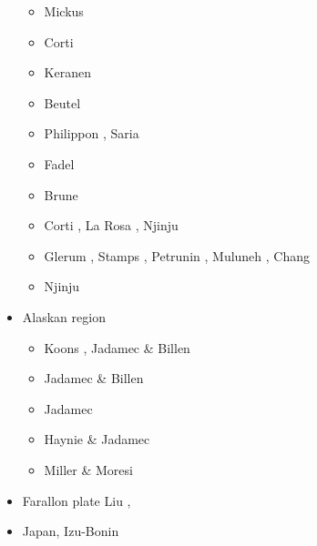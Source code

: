 \begin{itemize}
\begin{scriptsize}
\begin{itemize}
\item[\twothousandseven] Mickus \etal \cite{mitk07}
\item[\twothousandeight] Corti \cite{cort08}
\item[\twothousandnine] Keranen \etal \cite{kekj09}
\item[\twothousandten] Beutel \etal \cite{beve10}
\item[\twothousandfourteen] Philippon \etal \cite{phcs14}, Saria \etal \cite{sacs14}
\item[\twothousandfifteen] Fadel \etal \cite{favk15}
\item[\twothousandseventeen] Brune \etal \cite{brcr17} 
\item[\twothousandnineteen] Corti \etal \cite{cocf19}, La Rosa \etal \cite{lapk19}, Njinju \etal \cite{njas19}
\item[\twothousandtwenty] Glerum \etal \cite{glbs20}, Stamps \etal \cite{stkf20}, 
                          Petrunin \etal \cite{peke20}, Muluneh \etal \cite{mubi20},
                          Chang \etal \cite{chkd20}
\item[\twothousandtwentyone] Njinju \etal \cite{njsn21} 
\end{itemize}
\end{scriptsize}

\item{Alaskan region} 

\begin{scriptsize}
\begin{itemize}
\item[\twothousandten] Koons \etal \cite{kohp10}, Jadamec \& Billen \cite{jabi10a}
\item[\twothousandtwelve] Jadamec \& Billen \cite{jabi12}
\item[\twothousandthirteen] Jadamec \etal \cite{jabr13}
\item[\twothousandseventeen] Haynie \& Jadamec \cite{haja17}
\item[\twothousandeighteen] Miller \& Moresi \cite{mimo18}
\end{itemize}
\end{scriptsize}

\item{Farallon plate} 
{\scriptsize
Liu \etal \cite{lisg08},
\cite{list11}
\cite{list12}
\cite{licu16}
}
\item{Japan, Izu-Bonin} 


\end{itemize}
